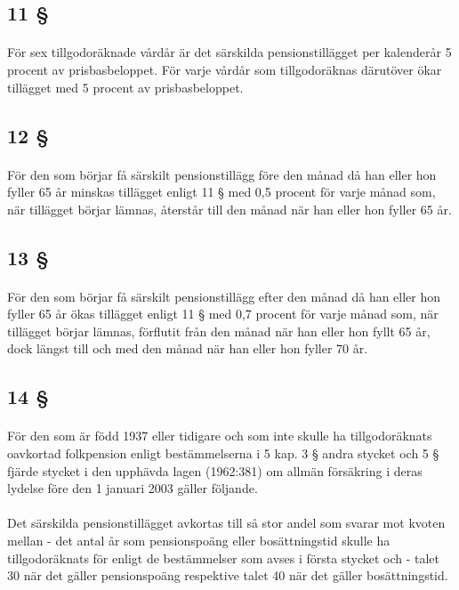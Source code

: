 \documentclass[a4paper,notitlepage,openany,10pt]{book}
\begin{document}
\subsection*{11 §}
\paragraph*{}
För sex tillgodoräknade vårdår är det särskilda pensionstillägget per kalenderår 5 procent av prisbasbeloppet. För varje vårdår som tillgodoräknas därutöver ökar tillägget med 5 procent av prisbasbeloppet.
\subsection*{12 §}
\paragraph*{}
För den som börjar få särskilt pensionstillägg före den månad då han eller hon fyller 65 år minskas tillägget enligt 11 § med 0,5 procent för varje månad som, när tillägget börjar lämnas, återstår till den månad när han eller hon fyller 65 år.
\subsection*{13 §}
\paragraph*{}
För den som börjar få särskilt pensionstillägg efter den månad då han eller hon fyller 65 år ökas tillägget enligt 11 § med 0,7 procent för varje månad som, när tillägget börjar lämnas, förflutit från den månad när han eller hon fyllt 65 år, dock längst till och med den månad när han eller hon fyller 70 år.
\subsection*{14 §}
\paragraph*{}
För den som är född 1937 eller tidigare och som inte skulle ha tillgodoräknats oavkortad folkpension enligt bestämmelserna i 5 kap. 3 § andra stycket och 5 § fjärde stycket i den upphävda lagen (1962:381) om allmän försäkring i deras lydelse före den 1 januari 2003 gäller följande.
\paragraph*{}
Det särskilda pensionstillägget avkortas till så stor andel som svarar mot kvoten mellan
\newline - det antal år som pensionspoäng eller bosättningstid skulle ha tillgodoräknats för enligt de bestämmelser som avses i första stycket och
\newline - talet 30 när det gäller pensionspoäng respektive talet 40 när det gäller bosättningstid.
\end{document}
